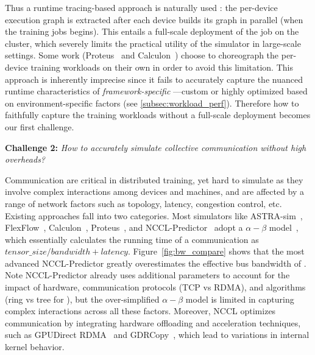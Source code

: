 Thus a runtime tracing-based approach is naturally used \cite{hu2022dpro,lu2023distsim,luo2022srifty,zhu2020daydream}: the per-device execution graph is extracted after each device builds its graph in parallel (when the training jobs begins).
This entails a full-scale deployment of the job on the cluster, which severely limits the practical utility of the simulator in large-scale settings.
Some work (Proteus~\cite{duan2024proteus} and Calculon~\cite{isaev2023calculon}) choose to choreograph the per-device training workloads on their own in order to avoid this limitation.
This approach is inherently imprecise since it fails to accurately capture the nuanced runtime characteristics of \textit{framework-specific \ops}---custom or highly optimized \ops based on environment-specific factors (see \cref{subsec:workload_perf}).
Therefore how to faithfully capture the training workloads without a full-scale deployment becomes our first challenge.








\vspace{0.3em}
\noindent \textbf{Challenge 2:}
\textit{How to accurately simulate collective communication without high overheads?}

Communication \ops are critical in distributed training, yet hard to simulate as they involve complex interactions among devices and machines, and are affected by a range of network factors such as topology, latency, congestion control, etc. Existing approaches fall into two categories. 
Most simulators like ASTRA-sim~\cite{won2023astra}, FlexFlow~\cite{jia2019beyond}, Calculon~\cite{isaev2023calculon}, Proteus~\cite{duan2024proteus}, and NCCL-Predictor~\cite{nccl} adopt a ${\alpha-\beta}$ model~\cite{valiant1990bridging}, which essentially calculates the running time of a communication \op as $tensor\_size/bandwidth + latency$.
Figure~\ref{fig:bw_compare} shows that the most advanced NCCL-Predictor greatly overestimates the effective bus bandwidth of \ar \ops.
Note NCCL-Predictor already uses additional parameters to account for the impact of hardware, communication protocols (TCP vs RDMA), and algorithms (ring vs tree for \ar), but the over-simplified ${\alpha-\beta}$ model is limited in capturing complex interactions across all these factors.
Moreover, NCCL optimizes communication by integrating hardware offloading and acceleration techniques, such as GPUDirect RDMA~\cite{gdrdma} and GDRCopy~\cite{gdrcopy}, which lead to variations in internal kernel behavior. 

